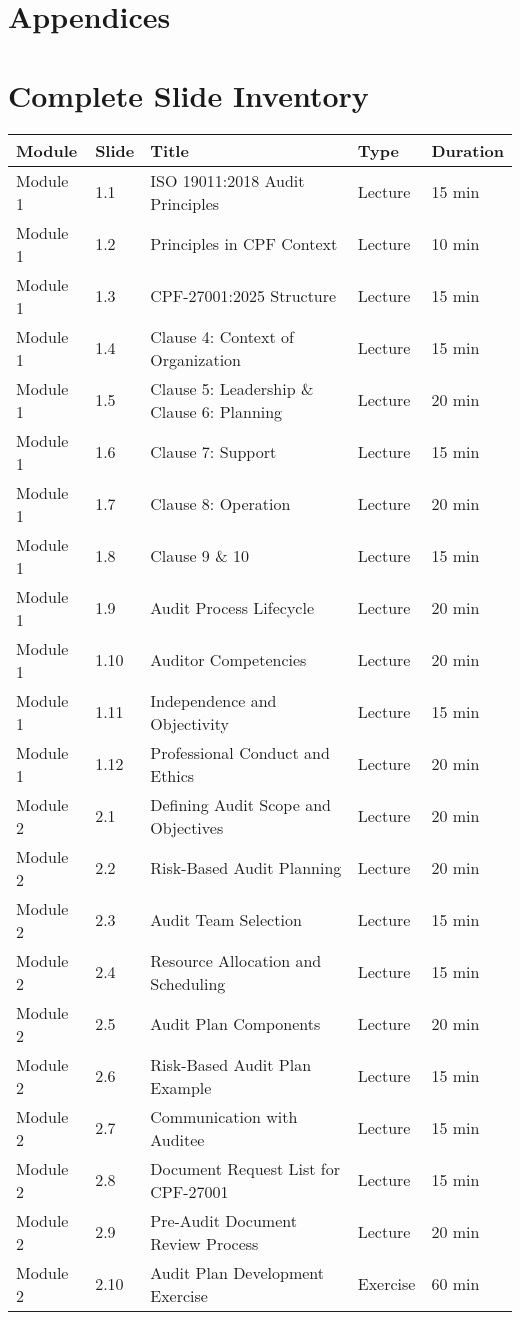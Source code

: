 \documentclass[11pt,a4paper]{article}
\begin{document}
\newpage

\section{Appendices}

\appendix

\section{Complete Slide Inventory}

\begin{longtable}{|p{2cm}|p{1cm}|p{7cm}|p{2cm}|p{1.5cm}|}
\hline
\textbf{Module} & \textbf{Slide} & \textbf{Title} & \textbf{Type} & \textbf{Duration} \\
\hline
\endhead

Module 1 & 1.1 & ISO 19011:2018 Audit Principles & Lecture & 15 min \\
Module 1 & 1.2 & Principles in CPF Context & Lecture & 10 min \\
Module 1 & 1.3 & CPF-27001:2025 Structure & Lecture & 15 min \\
Module 1 & 1.4 & Clause 4: Context of Organization & Lecture & 15 min \\
Module 1 & 1.5 & Clause 5: Leadership \& Clause 6: Planning & Lecture & 20 min \\
Module 1 & 1.6 & Clause 7: Support & Lecture & 15 min \\
Module 1 & 1.7 & Clause 8: Operation & Lecture & 20 min \\
Module 1 & 1.8 & Clause 9 \& 10 & Lecture & 15 min \\
Module 1 & 1.9 & Audit Process Lifecycle & Lecture & 20 min \\
Module 1 & 1.10 & Auditor Competencies & Lecture & 20 min \\
Module 1 & 1.11 & Independence and Objectivity & Lecture & 15 min \\
Module 1 & 1.12 & Professional Conduct and Ethics & Lecture & 20 min \\
\hline

Module 2 & 2.1 & Defining Audit Scope and Objectives & Lecture & 20 min \\
Module 2 & 2.2 & Risk-Based Audit Planning & Lecture & 20 min \\
Module 2 & 2.3 & Audit Team Selection & Lecture & 15 min \\
Module 2 & 2.4 & Resource Allocation and Scheduling & Lecture & 15 min \\
Module 2 & 2.5 & Audit Plan Components & Lecture & 20 min \\
Module 2 & 2.6 & Risk-Based Audit Plan Example & Lecture & 15 min \\
Module 2 & 2.7 & Communication with Auditee & Lecture & 15 min \\
Module 2 & 2.8 & Document Request List for CPF-27001 & Lecture & 15 min \\
Module 2 & 2.9 & Pre-Audit Document Review Process & Lecture & 20 min \\
Module 2 & 2.10 & Audit Plan Development Exercise & Exercise & 60 min \\
\hline


\end{longtable}
\end{document}
